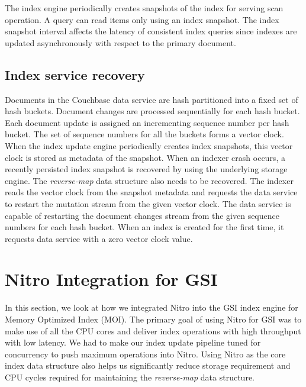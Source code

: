 \documentclass{vldb}
\begin{document}
The index engine periodically creates snapshots of the index for serving scan operation. A query can read items only using an index snapshot. The index snapshot interval affects the latency of consistent index queries since indexes are updated asynchronously with respect to the primary document.

\subsection{Index service recovery}
Documents in the Couchbase data service are hash partitioned into a fixed set of hash buckets. Document changes are processed sequentially for each hash bucket. Each document update is assigned an incrementing sequence number per hash bucket. The set of sequence numbers for all the buckets forms a vector clock. When the index update engine periodically creates index snapshots, this vector clock is stored as metadata of the snapshot. When an indexer crash occurs, a recently persisted index snapshot is recovered by using the underlying storage engine. The \textit{reverse-map} data structure also needs to be recovered. The indexer reads the vector clock from the snapshot metadata and requests the data service to restart the mutation stream from the given vector clock. The data service is capable of restarting the document changes stream from the given sequence numbers for each hash bucket. When an index is created for the first time, it requests data service with a zero vector clock value.

\section{Nitro Integration for GSI}
In this section, we look at how we integrated Nitro into the GSI index engine for Memory Optimized Index (MOI). The primary goal of using Nitro for GSI was to make use of all the CPU cores and deliver index operations with high throughput with low latency. We had to make our index update pipeline tuned for concurrency to push maximum operations into Nitro. Using Nitro as the core index data structure also helps us significantly reduce storage requirement and CPU cycles required for maintaining the \textit{reverse-map} data structure.
\end{document}
